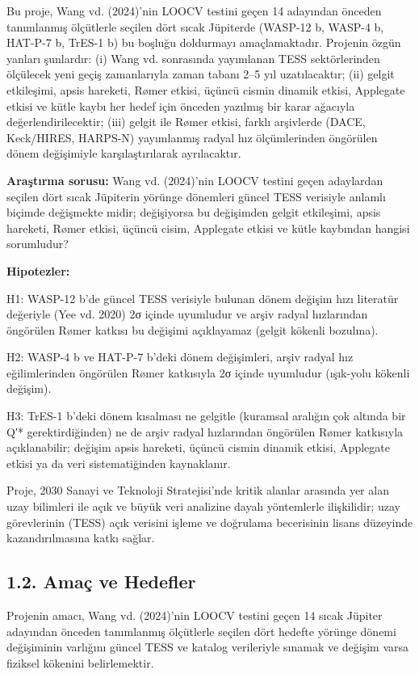 Bu proje, Wang vd. (2024)'nin LOOCV testini geçen 14 adayından önceden tanımlanmış ölçütlerle seçilen dört sıcak Jüpiterde (WASP-12 b, WASP-4 b, HAT-P-7 b, TrES-1 b) bu boşluğu doldurmayı amaçlamaktadır. Projenin özgün yanları şunlardır: (i) Wang vd. sonrasında yayımlanan TESS sektörlerinden ölçülecek yeni geçiş zamanlarıyla zaman tabanı 2–5 yıl uzatılacaktır; (ii) gelgit etkileşimi, apsis hareketi, Rømer etkisi, üçüncü cismin dinamik etkisi, Applegate etkisi ve kütle kaybı her hedef için önceden yazılmış bir karar ağacıyla değerlendirilecektir; (iii) gelgit ile Rømer etkisi, farklı arşivlerde (DACE, Keck/HIRES, HARPS-N) yayımlanmış radyal hız ölçümlerinden öngörülen dönem değişimiyle karşılaştırılarak ayrılacaktır.

\textbf{Araştırma sorusu:} Wang vd. (2024)'nin LOOCV testini geçen adaylardan seçilen dört sıcak Jüpiterin yörünge dönemleri güncel TESS verisiyle anlamlı biçimde değişmekte midir; değişiyorsa bu değişimden gelgit etkileşimi, apsis hareketi, Rømer etkisi, üçüncü cisim, Applegate etkisi ve kütle kaybından hangisi sorumludur?

\textbf{Hipotezler:}

H1: WASP-12 b'de güncel TESS verisiyle bulunan dönem değişim hızı literatür değeriyle (Yee vd. 2020) 2σ içinde uyumludur ve arşiv radyal hızlarından öngörülen Rømer katkısı bu değişimi açıklayamaz (gelgit kökenli bozulma).

H2: WASP-4 b ve HAT-P-7 b'deki dönem değişimleri, arşiv radyal hız eğilimlerinden öngörülen Rømer katkısıyla 2σ içinde uyumludur (ışık-yolu kökenli değişim).

H3: TrES-1 b'deki dönem kısalması ne gelgitle (kuramsal aralığın çok altında bir Q′* gerektirdiğinden) ne de arşiv radyal hızlarından öngörülen Rømer katkısıyla açıklanabilir; değişim apsis hareketi, üçüncü cismin dinamik etkisi, Applegate etkisi ya da veri sistematiğinden kaynaklanır.

Proje, 2030 Sanayi ve Teknoloji Stratejisi'nde kritik alanlar arasında yer alan uzay bilimleri ile açık ve büyük veri analizine dayalı yöntemlerle ilişkilidir; uzay görevlerinin (TESS) açık verisini işleme ve doğrulama becerisinin lisans düzeyinde kazandırılmasına katkı sağlar.

\subsection*{1.2. Amaç ve Hedefler}
Projenin amacı, Wang vd. (2024)'nin LOOCV testini geçen 14 sıcak Jüpiter adayından önceden tanımlanmış ölçütlerle seçilen dört hedefte yörünge dönemi değişiminin varlığını güncel TESS ve katalog verileriyle sınamak ve değişim varsa fiziksel kökenini belirlemektir.

